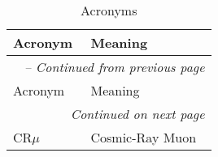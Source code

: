 \begin{longtable}{p{} p{}}
\caption{Acronyms} \label{tab:acronyms} \\

\toprule
Acronym & Meaning \\
\midrule
\endfirsthead

\multicolumn{2}{l}{\textit{\tablename\ \thetable{} -- Continued from previous page}} \\
\toprule
Acronym & Meaning \\
\midrule
\endhead

\multicolumn{2}{r}{\textit{Continued on next page}} \\
\bottomrule
\endfoot

\bottomrule
\endlastfoot


CR$\mu$ & Cosmic-Ray Muon \\

\end{longtable}
